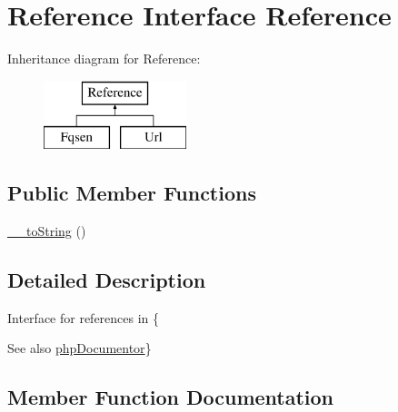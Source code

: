 \hypertarget{interfacephp_documentor_1_1_reflection_1_1_doc_block_1_1_tags_1_1_reference_1_1_reference}{}\section{Reference Interface Reference}
\label{interfacephp_documentor_1_1_reflection_1_1_doc_block_1_1_tags_1_1_reference_1_1_reference}
Inheritance diagram for Reference\+:\begin{figure}[H]
\begin{center}
\leavevmode
\includegraphics[height=2.000000cm]{interfacephp_documentor_1_1_reflection_1_1_doc_block_1_1_tags_1_1_reference_1_1_reference}
\end{center}
\end{figure}
\subsection*{Public Member Functions}
\begin{DoxyCompactItemize}
\item 
\mbox{\hyperlink{interfacephp_documentor_1_1_reflection_1_1_doc_block_1_1_tags_1_1_reference_1_1_reference_a7516ca30af0db3cdbf9a7739b48ce91d}{\+\_\+\+\_\+to\+String}} ()
\end{DoxyCompactItemize}


\subsection{Detailed Description}
Interface for references in \{\begin{DoxySeeAlso}{See also}
\mbox{\hyperlink{namespacephp_documentor}{php\+Documentor}}\} 
\end{DoxySeeAlso}


\subsection{Member Function Documentation}
\mbox{\label{interfacephp_documentor_1_1_reflection_1_1_doc_block_1_1_tags_1_1_reference_1_1_reference_a7516ca30af0db3cdbf9a7739b48ce91d}} 
